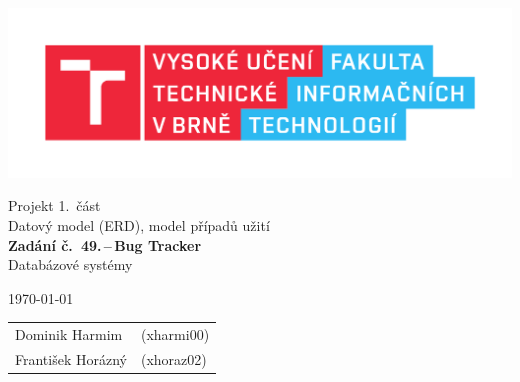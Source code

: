 \documentclass[11pt, a4paper]{article}
\begin{document}
	\begin{titlepage}
		\begin{center}
			\includegraphics[width=0.77 \linewidth]{FIT_logo.pdf} \\


            \Huge{Projekt 1.~část} \\
			\Huge{Datový model (ERD), model případů užití} \\
			\LARGE{\textbf{Zadání č.~49.\,--\,Bug Tracker}} \\
			\Large{Databázové systémy}
			
		\end{center}
		
		{\Large
			\today
			\hfill
			\begin{tabular}{l l}
				Dominik Harmim & (xharmi00) \\
				František Horázný & (xhoraz02) \\
			\end{tabular}
		}
	\end{titlepage}
\end{document}
